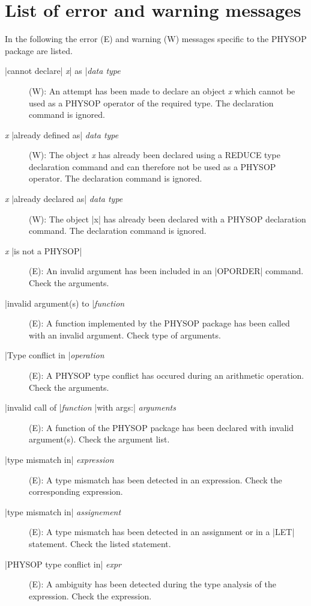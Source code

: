 \section{List of error and warning messages}
In the following the error (E) and warning (W) messages specific to the
PHYSOP package are listed.
\begin{description}
\item[|cannot declare| {\it x}| as |{\it data type}] (W):
 An attempt has been made to declare an
object {\it x} which cannot be used as a PHYSOP operator of the
required type. The declaration command is ignored.

\item [{\it x} |already defined as| {\it data type}] (W): The object
{\it x} has already been declared using a REDUCE type declaration
command and can therefore not be used as a PHYSOP operator.
The declaration command is ignored.

\item [{\it x} |already declared as| {\it data type}] (W): The object
|x| has already been declared with a PHYSOP declaration command.
The declaration command is ignored.

\item[{\it x} |is not a PHYSOP|] (E): An invalid argument has been
included in an |OPORDER| command. Check the arguments.

\item[|invalid argument(s) to |{\it function}] (E): A
function implemented by the PHYSOP package has been called with an
invalid argument. Check type of arguments.


\item[|Type conflict in |{\it operation}] (E): A PHYSOP type conflict
has occured during an arithmetic operation. Check the arguments.

\item [|invalid call of |{\it function} |with args:| {\it arguments}]
(E): A function
of the PHYSOP package has been declared with invalid argument(s). Check
the argument list.

\item[|type mismatch in| {\it expression}] (E): A type mismatch has
been detected in an expression.  Check the corresponding expression.

\item[|type mismatch in| {\it assignement}] (E): A type
mismatch has been detected in an assignment or in a |LET|
statement. Check the listed statement.

\item[|PHYSOP type conflict in| {\it expr}] (E): A ambiguity has been
detected during the type analysis of the expression. Check the
expression.


\end{description}
